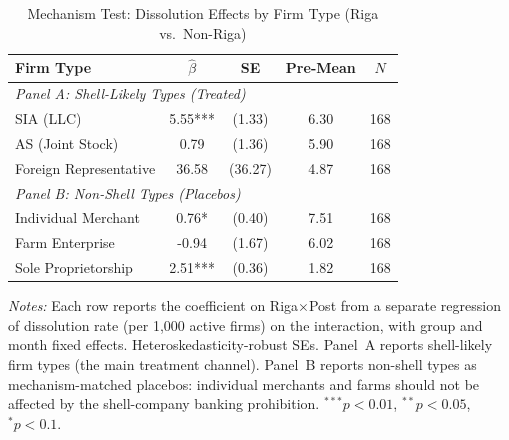 \begin{table}[t]
\centering
\caption{Mechanism Test: Dissolution Effects by Firm Type (Riga vs.~Non-Riga)}
\label{tab:mechanism}
\begin{tabular}{lcccc}
\hline\hline
Firm Type & $\hat{\beta}$ & SE & Pre-Mean & $N$ \\
\hline
\multicolumn{5}{l}{\textit{Panel A: Shell-Likely Types (Treated)}} \\
\quad SIA (LLC) & 5.55*** & (1.33) & 6.30 & 168 \\
\quad AS (Joint Stock) & 0.79 & (1.36) & 5.90 & 168 \\
\quad Foreign Representative & 36.58 & (36.27) & 4.87 & 168 \\
[6pt]
\multicolumn{5}{l}{\textit{Panel B: Non-Shell Types (Placebos)}} \\
\quad Individual Merchant & 0.76* & (0.40) & 7.51 & 168 \\
\quad Farm Enterprise & -0.94 & (1.67) & 6.02 & 168 \\
\quad Sole Proprietorship & 2.51*** & (0.36) & 1.82 & 168 \\
\hline\hline
\end{tabular}
\begin{tablenotes}[flushleft]
\small
\item \textit{Notes:} Each row reports the coefficient on Riga$\times$Post from a separate regression of dissolution rate (per 1,000 active firms) on the interaction, with group and month fixed effects. Heteroskedasticity-robust SEs. Panel~A reports shell-likely firm types (the main treatment channel). Panel~B reports non-shell types as mechanism-matched placebos: individual merchants and farms should not be affected by the shell-company banking prohibition. $^{***}p<0.01$, $^{**}p<0.05$, $^{*}p<0.1$.
\end{tablenotes}
\end{table}

